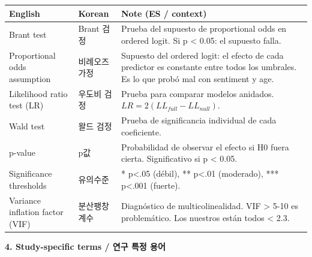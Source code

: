 \documentclass[10pt,a4paper]{article}
\begin{document}
\begin{longtable}{@{}p{3.6cm} p{3.5cm} p{9cm}@{}}
\toprule
\textbf{English} & \textbf{Korean} & \textbf{Note (ES / context)} \\
\midrule
Brant test                   & Brant 검정                     & Prueba del supuesto de proportional odds en ordered logit. Si p < 0.05: el supuesto falla. \\
Proportional odds assumption & 비례오즈 가정                   & Supuesto del ordered logit: el efecto de cada predictor es constante entre todos los umbrales. Es lo que probó mal con sentiment y age. \\
Likelihood ratio test (LR)   & 우도비 검정                     & Prueba para comparar modelos anidados. $LR = 2(LL_{full} - LL_{null})$. \\
Wald test                    & 왈드 검정                       & Prueba de significancia individual de cada coeficiente. \\
p-value                      & p값                           & Probabilidad de observar el efecto si H0 fuera cierta. Significativo si p < 0.05. \\
Significance thresholds       & 유의수준                      & * p<.05 (débil), ** p<.01 (moderado), *** p<.001 (fuerte). \\
Variance inflation factor (VIF) & 분산팽창계수                  & Diagnóstico de multicolinealidad. VIF > 5-10 es problemático. Los nuestros están todos < 2.3. \\
\bottomrule
\end{longtable}

\vspace{10pt}
\noindent\normalsize\textbf{\large 4. Study-specific terms / 연구 특정 용어}

\vspace{4pt}

\footnotesize
\end{document}

